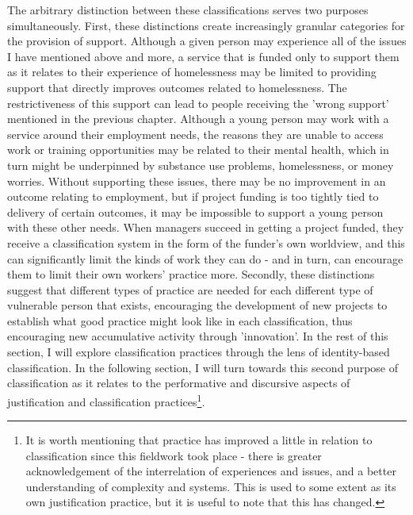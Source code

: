 The arbitrary distinction between these classifications serves two purposes simultaneously. First, these distinctions create increasingly granular categories for the provision of support. Although a given person may experience all of the issues I have mentioned above and more, a service that is funded only to support them as it relates to their experience of homelessness may be limited to providing support that directly improves outcomes related to homelessness. The restrictiveness of this support can lead to people receiving the 'wrong support' mentioned in the previous chapter. Although a young person may work with a service around their employment needs, the reasons they are unable to access work or training opportunities may be related to their mental health, which in turn might be underpinned by substance use problems, homelessness, or money worries. Without supporting these issues, there may be no improvement in an outcome relating to employment, but if project funding is too tightly tied to delivery of certain outcomes, it may be impossible to support a young person with these other needs. When managers succeed in getting a project funded, they receive a classification system in the form of the funder's own worldview, and this can significantly limit the kinds of work they can do - and in turn, can encourage them to limit their own workers' practice more.  Secondly, these distinctions suggest that different types of practice are needed for each different type of vulnerable person that exists, encouraging the development of new projects to establish what good practice might look like in each classification, thus encouraging new accumulative activity through 'innovation'. In the rest of this section, I will explore classification practices through the lens of identity-based classification. In the following section, I will turn towards this second purpose of classification as it relates to the performative and discursive aspects of justification and classification practices\footnote{It is worth mentioning that practice has improved a little in relation to classification since this fieldwork took place - there is greater acknowledgement of the interrelation of experiences and issues, and a better understanding of complexity and systems. This is used to some extent as its own justification practice, but it is useful to note that this has changed.}.

